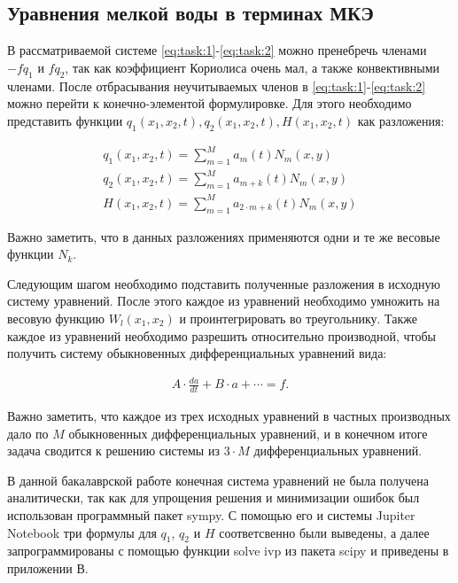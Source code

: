 \documentclass[14pt]{extreport}
\begin{document}
\subsection{Уравнения мелкой воды в терминах МКЭ}

В рассматриваемой системе \ref{eq:task:1}-\ref{eq:task:2} можно пренебречь членами $-fq_{1}$ и $fq_2$, так как коэффициент Кориолиса очень мал, а также конвективными членами. После отбрасывания неучитываемых членов в \ref{eq:task:1}-\ref{eq:task:2} можно перейти к конечно-элементой формулировке. Для этого необходимо представить функции $q_1(x_1, x_2,t) , q_2(x_1, x_2,t), H(x_1, x_2,t)$ как разложения:

\begin{eqnarray}\label{eq:fem:approx}
q_1(x_1, x_2, t) = \sum\limits_{m=1}^{M} a_m(t)N_m(x, y) \\
q_2(x_1, x_2, t) = \sum\limits_{m=1}^{M} a_{m+k}(t)N_m(x, y) \\
H(x_1, x_2, t) = \sum\limits_{m=1}^{M} a_{2\cdot m+k}(t)N_m(x, y)
\end{eqnarray}

Важно заметить, что в данных разложениях применяются одни и те же весовые функции $N_k$.

Следующим шагом необходимо подставить полученные разложения в исходную систему уравнений. После этого каждое из уравнений необходимо умножить на весовую функцию $W_l(x_1, x_2)$ и проинтегрировать во треугольнику. Также каждое из уравнений необходимо разрешить относительно производной, чтобы получить систему обыкновенных дифференциальных уравнений\cite{bib:calc:gurevich:2004} вида:

\begin{eqnarray}
A \cdot \frac{da}{dt} + B \cdot a + \cdots = f.
\end{eqnarray}

Важно заметить, что каждое из трех исходных уравнений в частных производных дало по $M$ обыкновенных дифференциальных уравнений, и в конечном итоге задача сводится к решению системы из $3\cdot M$ дифференциальных уравнений.

В данной бакалаврской работе конечная система уравнений не была получена аналитически, так как для упрощения решения и минимизации ошибок был использован программный пакет sympy\cite{bib:python:mastering:2015}. С помощью его и системы Jupiter Notebook три формулы для $q_1$, $q_2$ и $H$ соответсвенно  были выведены, а далее запрограммированы с помощью функции solve ivp из пакета scipy и приведены в приложении В.
\end{document}

